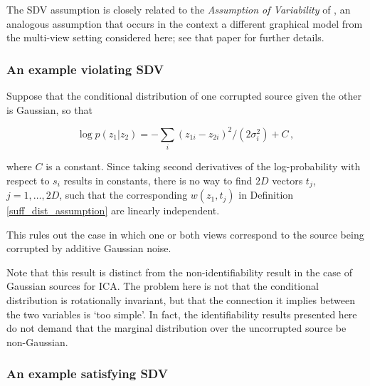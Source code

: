 The SDV assumption is closely related to the \emph{Assumption of Variability} of \cite{hyvarinen19a}, an analogous assumption that occurs in the context a different graphical model from the multi-view setting considered here; see that paper for further details.





\subsubsection{An example violating SDV}

Suppose that the conditional distribution of one corrupted source given the other is Gaussian, so that

\begin{equation}
\log p(z_1|z_2) =  -\sum_i (z_{1i} - z_{2i})^2/(2\sigma_i^2) + C \,, \label{eq:unsatisfied}
\end{equation}

where $C$ is a constant.
Since taking second derivatives of the log-probability with respect to $s_i$ results in constants,
there is no way to find $2D$ vectors ${t}_j$, $j=1, \ldots, 2D$, such that the corresponding ${w}(z_1, t_j)$ in Definition \ref{suff_dist_assumption} are linearly independent.

This rules out the case in which one or both views correspond to the source being corrupted by additive Gaussian noise.

Note that this result is distinct from the non-identifiability result in the case of Gaussian sources for ICA.
The problem here is not that the conditional distribution is rotationally invariant, but that the connection it implies between the two variables is `too simple'.
In fact, the identifiability results presented here do not demand that the marginal distribution over the uncorrupted source be non-Gaussian.



\subsubsection{An example satisfying SDV}

